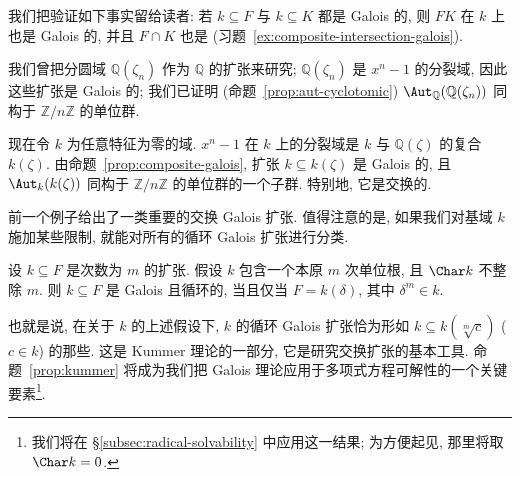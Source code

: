我们把验证如下事实留给读者: 若 $k\subseteq F$ 与 $k\subseteq K$ 都是 Galois 的, 则 $FK$ 在 $k$ 上也是 Galois 的, 并且 $F\cap K$ 也是 (习题~\ref{ex:composite-intersection-galois}).

\begin{example}\label{ex:cyclotomic-abelian}
我们曾把分圆域 $\mathbb{Q}(\zeta_n)$ 作为 $\mathbb{Q}$ 的扩张来研究; $\mathbb{Q}(\zeta_n)$ 是 $x^n-1$ 的分裂域, 因此这些扩张是 Galois 的; 我们已证明 (命题~\ref{prop:aut-cyclotomic}) $\Aut_{\mathbb{Q}}(\mathbb{Q}(\zeta_n))$ 同构于 $\mathbb{Z}/n\mathbb{Z}$ 的单位群.

现在令 $k$ 为任意特征为零的域. $x^n-1$ 在 $k$ 上的分裂域是 $k$ 与 $\mathbb{Q}(\zeta)$ 的复合 $k(\zeta)$. 由命题~\ref{prop:composite-galois}, 扩张 $k\subseteq k(\zeta)$ 是 Galois 的, 且 $\Aut_k(k(\zeta))$ 同构于 $\mathbb{Z}/n\mathbb{Z}$ 的单位群的一个子群. 特别地, 它是交换的.
\end{example}

前一个例子给出了一类重要的交换 Galois 扩张. 值得注意的是, 如果我们对基域 $k$ 施加某些限制, 就能对所有的循环 Galois 扩张进行分类.

\begin{proposition}\label{prop:kummer}
设 $k\subseteq F$ 是次数为 $m$ 的扩张. 假设 $k$ 包含一个本原 $m$ 次单位根, 且 $\Char k$ 不整除 $m$. 则 $k\subseteq F$ 是 Galois 且循环的, 当且仅当 $F=k(\delta)$, 其中 $\delta^m\in k$.
\end{proposition}

也就是说, 在关于 $k$ 的上述假设下, $k$ 的循环 Galois 扩张恰为形如 $k\subseteq k(\sqrt[m]{c})$ ($c\in k$) 的那些. 这是 Kummer 理论的一部分, 它是研究交换扩张的基本工具. 命题~\ref{prop:kummer} 将成为我们把 Galois 理论应用于多项式方程可解性的一个关键要素\footnote{我们将在 §\ref{subsec:radical-solvability} 中应用这一结果; 为方便起见, 那里将取 $\Char k=0$.}.

